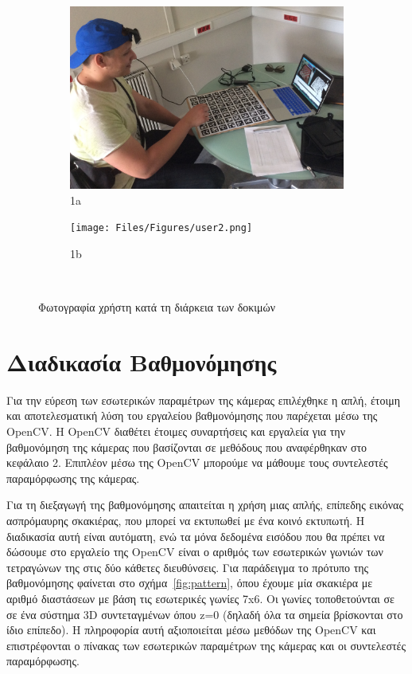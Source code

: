 \begin{figure}[H]
\begin{subfigure}{.5\textwidth}
  \centering
  \includegraphics[width=.8\linewidth]{Files/Figures/user1.png}
  \caption{1a}
  \label{fig:sfig1}
\end{subfigure}%
\begin{subfigure}{.5\textwidth}
  \centering
  \texttt{[image: Files/Figures/user2.png]}
  \caption{1b}
  \label{fig:sfig2}
\end{subfigure}\\
\caption{Φωτογραφία χρήστη κατά τη διάρκεια των δοκιμών}
\label{fig:test}
\end{figure}



\section{Διαδικασία Βαθμονόμησης}


Για την εύρεση των εσωτερικών παραμέτρων της κάμερας επιλέχθηκε η απλή, έτοιμη και αποτελεσματική λύση του εργαλείου βαθμονόμησης που παρέχεται μέσω της OpenCV. Η OpenCV διαθέτει έτοιμες συναρτήσεις και εργαλεία για την βαθμονόμηση της κάμερας που βασίζονται σε μεθόδους που αναφέρθηκαν στο κεφάλαιο 2. Επιπλέον μέσω της OpenCV μπορούμε να μάθουμε τους συντελεστές παραμόρφωσης της κάμερας. 


Για τη διεξαγωγή της βαθμονόμησης απαιτείται η χρήση μιας απλής, επίπεδης εικόνας ασπρόμαυρης σκακιέρας, που μπορεί να εκτυπωθεί με ένα κοινό εκτυπωτή. Η διαδικασία αυτή είναι αυτόματη, ενώ τα μόνα δεδομένα εισόδου που θα πρέπει να δώσουμε στο εργαλείο της OpenCV είναι ο αριθμός των εσωτερικών γωνιών των τετραγώνων της στις δύο κάθετες διευθύνσεις. Για παράδειγμα το πρότυπο της βαθμονόμησης φαίνεται στο σχήμα~\ref{fig:pattern}, όπου έχουμε μία σκακιέρα με αριθμό διαστάσεων με βάση τις εσωτερικές γωνίες 7x6.
Οι γωνίες τοποθετούνται σε σε ένα σύστημα 3D συντεταγμένων όπου z=0 (δηλαδή όλα τα σημεία βρίσκονται στο ίδιο επίπεδο). Η πληροφορία αυτή αξιοποιείται μέσω μεθόδων της OpenCV και επιστρέφονται ο πίνακας των εσωτερικών παραμέτρων της κάμερας και οι συντελεστές παραμόρφωσης. 



